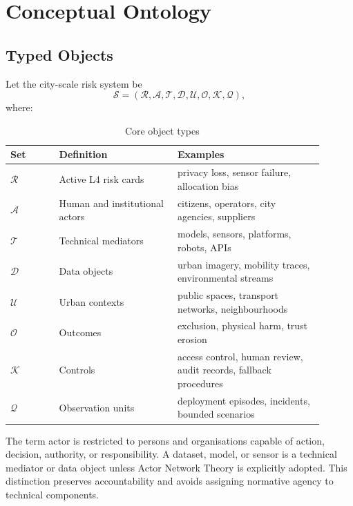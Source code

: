 \documentclass[11pt,a4paper]{article}
\begin{document}
\section{Conceptual Ontology}

\subsection{Typed Objects}

Let the city-scale risk system be
\begin{equation}
\mathcal{S} =
\left(
\mathcal{R},
\mathcal{A},
\mathcal{T},
\mathcal{D},
\mathcal{U},
\mathcal{O},
\mathcal{K},
\mathcal{Q}
\right),
\end{equation}
where:

\begin{table}[h]
\centering
\caption{Core object types}
\begin{tabular}{p{0.14\linewidth}p{0.34\linewidth}p{0.42\linewidth}}
\toprule
Set & Definition & Examples \\
\midrule
$\mathcal{R}$ & Active L4 risk cards & privacy loss, sensor failure, allocation bias \\
$\mathcal{A}$ & Human and institutional actors & citizens, operators, city agencies, suppliers \\
$\mathcal{T}$ & Technical mediators & models, sensors, platforms, robots, APIs \\
$\mathcal{D}$ & Data objects & urban imagery, mobility traces, environmental streams \\
$\mathcal{U}$ & Urban contexts & public spaces, transport networks, neighbourhoods \\
$\mathcal{O}$ & Outcomes & exclusion, physical harm, trust erosion \\
$\mathcal{K}$ & Controls & access control, human review, audit records, fallback procedures \\
$\mathcal{Q}$ & Observation units & deployment episodes, incidents, bounded scenarios \\
\bottomrule
\end{tabular}
\end{table}

The term actor is restricted to persons and organisations capable of action, decision, authority, or responsibility. A dataset, model, or sensor is a technical mediator or data object unless Actor Network Theory is explicitly adopted. This distinction preserves accountability and avoids assigning normative agency to technical components.
\end{document}
